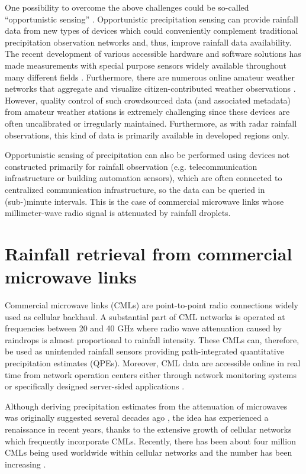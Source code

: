 \documentclass{ctuthesis}\usepackage[]{graphicx}\usepackage[]{color}
\begin{document}
One possibility to overcome the above challenges could be so-called \enquote{opportunistic sensing} \citep{tauroMeasurementsObservationsXXI2018}. Opportunistic precipitation sensing can provide rainfall data from new types of devices which could conveniently complement traditional precipitation observation networks and, thus, improve rainfall data availability. The recent development of various accessible hardware and software solutions has made measurements with special purpose sensors widely available throughout many different fields \citep{swanSensorManiaInternet2012}. Furthermore, there are numerous online amateur weather networks that aggregate and visualize citizen-contributed weather observations \citep{gharesifardBenchmarkingCitizenObservatories2017, devosPotentialUrbanRainfall2017}. However, quality control of such crowdsourced data (and associated metadata) from amateur weather stations is extremely challenging since these devices are often uncalibrated or irregularly maintained. Furthermore, as with radar rainfall observations, this kind of data is primarily available in developed regions only.

Opportunistic sensing of precipitation can also be performed using devices not constructed primarily for rainfall observation (e.g. telecommunication infrastructure or building automation sensors), which are often connected to centralized communication infrastructure, so the data can be queried in (sub-)minute intervals. This is the case of commercial microwave links whose millimeter-wave radio signal is attenuated by rainfall droplets.


\section{Rainfall retrieval from commercial microwave links}

Commercial microwave links (CMLs) are point-to-point radio connections widely used as cellular backhaul. A substantial part of CML networks is operated at frequencies between 20 and 40 GHz where radio wave attenuation caused by raindrops is almost proportional to rainfall intensity. These CMLs can, therefore, be used as unintended rainfall sensors providing path-integrated quantitative precipitation estimates (QPEs). Moreover, CML data are accessible online in real time from network operation centers either through network monitoring systems or specifically designed server-sided applications \citep{chwalaRealtimeDataAcquisition2016}.

Although deriving precipitation estimates from the attenuation of microwaves was originally suggested several decades ago \citep{atlasPathAreaIntegratedRainfall1977}, the idea has experienced a renaissance in recent years, thanks to the extensive growth of cellular networks \citep{messer2006environmental, leijnseRainfallMeasurementUsing2007} which frequently incorporate CMLs. Recently, there has been about four million CMLs being used worldwide within cellular networks and the number has been increasing \citep{ericssonEricssonMicrowaveOutlook2016}.
\end{document}

